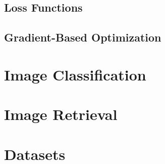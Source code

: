 \subsection{Loss Functions}
\label{subsec:back:loss}



\subsection{Gradient-Based Optimization}
\label{subsec:back:optim}


\section{Image Classification}
\label{sec:back:image-classification}




\section{Image Retrieval}
\label{sec:back:image-retrieval}


\section{Datasets}
\label{sec:back:datasets}
